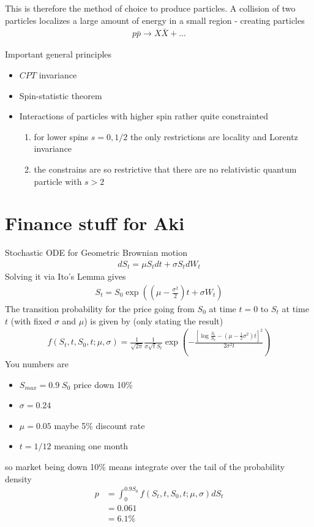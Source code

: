 \documentclass[10pt,a4paper]{book}
\theoremstyle{definition}
\begin{document}
This is therefore the method of choice to produce particles. A collision of two particles localizes a large amount of energy in a small region - creating particles
\begin{align}
    p\bar{p}\rightarrow X\bar{X}+ ...
\end{align}

Important general principles
\begin{itemize}
    \item $CPT$ invariance
    \item Spin-statistic theorem
    \item Interactions of particles with higher spin rather quite constrainted
    \begin{enumerate}
        \item for lower spins $s=0, 1/2$ the only restrictions are locality and Lorentz invariance
        \item the constrains are so restrictive that there are no relativistic quantum particle with $s>2$
    \end{enumerate}
\end{itemize}

\newpage
\chapter{Finance stuff for Aki}
Stochastic ODE for Geometric Brownian motion
\begin{align}
 dS_t=\mu S_t dt+\sigma S_t dW_t
\end{align}
Solving it via Ito's Lemma gives
\begin{align}
 S_t=S_0 \exp\left(\left(\mu-\frac{\sigma^2}{2}\right)t+\sigma W_t\right)
\end{align}
The transition probability for the price going from $S_0$ at time $t=0$ to $S_t$ at time $t$ (with fixed $\sigma$ and $\mu$) is given by (only stating the result)
\begin{align}
f(S_t,t,S_0,t;\mu,\sigma)=\frac{1}{\sqrt{2\pi}}\frac{1}{\sigma\sqrt{t} S_t}\exp\left(-\frac{\left[\log\frac{S_t}{S_0}-\left(\mu-\frac{1}{2}\sigma^2\right)t\right]^2}{2\sigma^2 t}\right)
\end{align}
You numbers are
\begin{itemize}
\item $S_{max}=0.9\; S_0$ price down 10\%
\item $\sigma=0.24$
\item $\mu=0.05$ maybe 5\% discount rate
\item $t=1/12$ meaning one month
\end{itemize}
so market being down 10\% means integrate over the tail of the probability density 
\begin{align}
p&=\int_0^{0.9S_0} f(S_t,t,S_0,t;\mu,\sigma) dS_t\\
&=0.061\\
&=6.1\%
\end{align}
\end{document}
